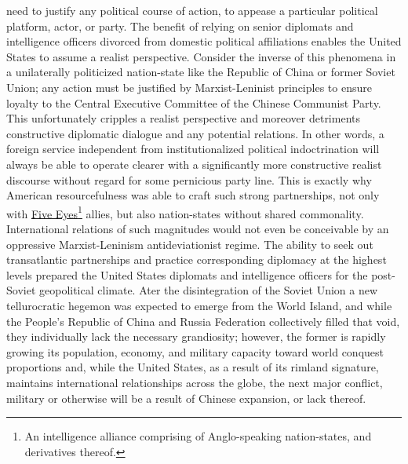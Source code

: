 \documentclass[12pt]{article}
\begin{document}
need to justify any political course of action, to appease a particular political platform, actor, or party. The benefit of relying on senior diplomats and intelligence officers divorced from domestic political affiliations enables the United States to assume a realist perspective. Consider the inverse of this phenomena in a unilaterally politicized nation-state like the Republic of China or former Soviet Union; any action must be justified by Marxist-Leninist principles to ensure loyalty to the Central Executive Committee of the Chinese Communist Party. This unfortunately cripples a realist perspective and moreover detriments constructive diplomatic dialogue and any potential relations. In other words, a foreign service independent from institutionalized political indoctrination will always be able to operate clearer with a significantly more constructive realist discourse without regard for some pernicious party line. This is exactly why American resourcefulness was able to craft such strong partnerships, not only with \underline{Five Eyes}\footnote{An intelligence alliance comprising of Anglo-speaking nation-states, and derivatives thereof.} allies, but also nation-states without shared commonality. International relations of such magnitudes would not even be conceivable by an oppressive Marxist-Leninism antideviationist regime. The ability to seek out transatlantic partnerships and practice corresponding diplomacy at the highest levels prepared the United States diplomats and intelligence officers for the post-Soviet geopolitical climate. Ater the disintegration of the Soviet Union a new tellurocratic hegemon was expected to emerge from the World Island, and while the People's Republic of China and Russia Federation collectively filled that void, they individually lack the necessary grandiosity; however, the former is rapidly growing its population, economy, and military capacity toward world conquest proportions and, while the United States, as a result of its rimland signature, maintains international relationships across the globe, the next major conflict, military or otherwise will be a result of Chinese expansion, or lack thereof.
\end{document}
